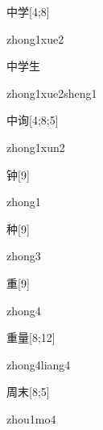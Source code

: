 \begin{verbete}{中学}[4;8]
\begin{pronuncia}{zhong1xue2}
\end{pronuncia}
\end{verbete}

\begin{verbete}{中学生}
\begin{pronuncia}{zhong1xue2sheng1}
\end{pronuncia}
\end{verbete}

\begin{verbete}{中询}[4;8;5]
\begin{pronuncia}{zhong1xun2}
\end{pronuncia}
\end{verbete}

\begin{verbete}[zhong1]{钟}[9]
\begin{pronuncia}{zhong1}
\end{pronuncia}
\end{verbete}

\begin{verbete}[zhong3]{种}[9]
\begin{pronuncia}{zhong3}
\end{pronuncia}
\end{verbete}

\begin{verbete}[zhong4]{重}[9]
\begin{pronuncia}{zhong4}
\end{pronuncia}
\end{verbete}

\begin{verbete}{重量}[8;12]
\begin{pronuncia}{zhong4liang4}
\end{pronuncia}
\end{verbete}

\begin{verbete}[zhou1mo4]{周末}[8;5]
\begin{pronuncia}{zhou1mo4}
\end{pronuncia}
\end{verbete}

